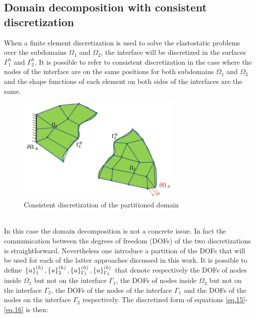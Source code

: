  \subsection{Domain decomposition with consistent discretization}\label{ssec31}
 When a finite element discretization is used to solve the elastostatic problems over the subdomains $\Omega_1$ and $\Omega_2$, the interface will be discretized in the surfaces $\Gamma_1^h$ and $\Gamma_2^h$.  
 It is possible to refer to consistent discretization in the case where the nodes of the interface are on the same positions for both subdomains $\Omega_1$ and $\Omega_2$ and the shape functions of each element on both sides of the interfaces are the same.
 \begin{figure}[ht]
 \centering
 \includegraphics[width=8cm]{images/Ch1/Consistent_discretization}
 \caption{Consistent discretization of the partitioned domain} 
 \label{fig.3}
 \end{figure}
 \\
 In this case the domain decomposition is not a concrete issue. In fact the communication between the degrees of freedom (DOFs) of the two discretizations is straightforward. Nevertheless one introduce a partition of the DOFs that will be used for each of the latter approaches discussed in this work.
 It is possible to define $\left\lbrace{u}\right \rbrace_1^{(h)},\left\lbrace{u}\right \rbrace_2^{(h)},\left\lbrace{u}\right \rbrace_{\Gamma_1}^{(h)},\left\lbrace{u}\right \rbrace_{\Gamma_2}^{(h)}$ that denote respectively the DOFs of nodes inside $\Omega_1$ but not on the interface $\Gamma_1$, the DOFs of nodes inside $\Omega_2$ but not on the interface $\Gamma_2$, the DOFs of the nodes of the interface $\Gamma_1$ and the DOFs of the nodes on the interface $\Gamma_2$ respectively. The discretized form of equations \eqref{eq.15}-\eqref{eq.16} is then: 

